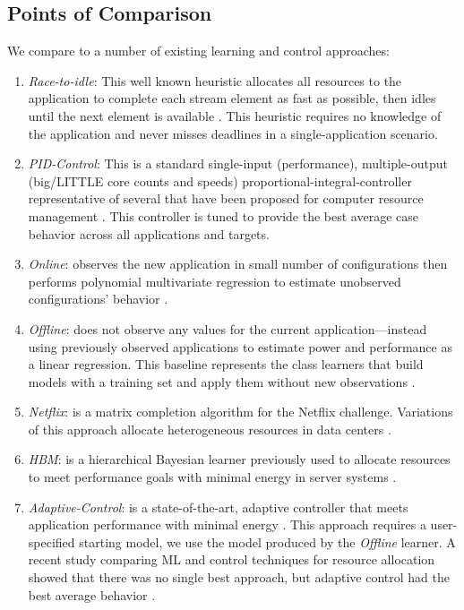 \subsection{Points of Comparison}
We compare \SYSTEM{} to a number of existing learning and control
approaches:
\begin{enumerate}
\item \textit{Race-to-idle}: This well known heuristic allocates all
  resources to the application to complete each stream element as fast
  as possible, then idles until the next element is available
  \cite{kim-cpsna,powerslope,heisner}.  This heuristic requires no
  knowledge of the application and never misses deadlines in a
  single-application scenario.
\item \textit{PID-Control}: This is a standard single-input
  (performance), multiple-output (big/LITTLE core counts and speeds)
  proportional-integral-controller representative of several that have
  been proposed for computer resource management
  \cite{Hellerstein2004a,METE}.  This controller is tuned to provide
  the best average case behavior across all applications and targets.
\item \textit{Online}: observes the new application in small number of
  configurations then performs polynomial multivariate regression to
  estimate unobserved configurations' behavior
  \cite{LEO,Li2006,Ponamarev}.
\item \textit{Offline}: does not observe any values for the current
  application---instead using previously observed applications to
  estimate power and performance as a linear regression.  This
  baseline represents the class learners that build models with a
  training set and apply them without new observations
  \cite{PUPiL,LeeBrooks2006,CPR}.
\item \textit{Netflix}: is a matrix completion algorithm for the
  Netflix challenge. Variations of this approach allocate
  heterogeneous resources in data centers \cite{Paragon,quasar}.
\item \textit{HBM}: is a hierarchical Bayesian learner previously used
  to allocate resources to meet performance goals with minimal energy
  in server systems \cite{LEO}.
\item \textit{Adaptive-Control}: is a state-of-the-art, adaptive
  controller that meets application performance with minimal energy
  \cite{POET}.  This approach requires a user-specified starting
  model, we use the model produced by the \emph{Offline} learner. A
  recent study comparing ML and control techniques for resource
  allocation showed that there was no single best approach, but
  adaptive control had the best average behavior \cite{TAAS}.
\end{enumerate}


